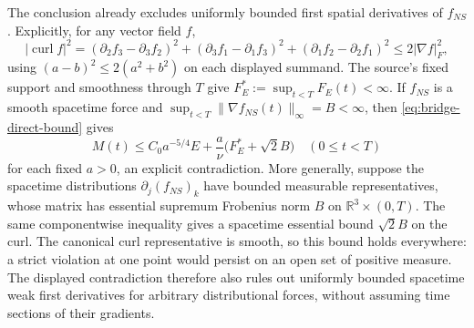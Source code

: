 The conclusion already excludes uniformly bounded first spatial
derivatives of $f_{NS}$.  Explicitly, for any vector field $f$,
\[
 |\operatorname{curl}f|^2
   =(\partial_2f_3-\partial_3f_2)^2
    +(\partial_3f_1-\partial_1f_3)^2
    +(\partial_1f_2-\partial_2f_1)^2
   \le2|\nabla f|_F^2,
\]
using $(a-b)^2\le2(a^2+b^2)$ on each displayed summand.
The source's fixed support and smoothness through $T$ give
$F_E^*:=\sup_{t<T}F_E(t)<\infty$.
If $f_{NS}$ is a smooth spacetime force and
$\sup_{t<T}\|\nabla f_{NS}(t)\|_\infty=B<\infty$, then
\eqref{eq:bridge-direct-bound} gives
\[
 M(t)\le C_0a^{-5/4}E+
                  \frac{a}{\nu}\bigl(F_E^*+\sqrt2 B\bigr)
 \quad(0\le t<T)
\]
for each fixed $a>0$, an explicit contradiction.
More generally, suppose the spacetime distributions
$\partial_j(f_{NS})_k$ have bounded measurable representatives, whose
matrix has essential supremum Frobenius norm $B$ on
$\mathbb R^3\times(0,T)$.  The same componentwise inequality gives a
spacetime essential bound $\sqrt2B$ on the curl.  The canonical curl
representative is smooth, so this bound holds everywhere: a strict
violation at one point would persist on an open set of positive
measure.  The displayed contradiction therefore also rules out
uniformly bounded spacetime weak first derivatives for arbitrary
distributional forces, without assuming time sections of their gradients.


